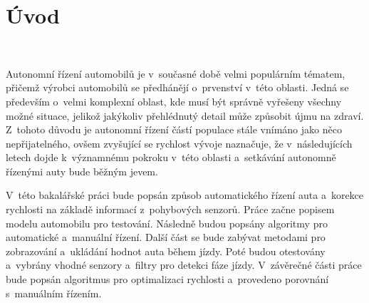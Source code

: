 \chapter*{Úvod}
\label{sec:Introduction}
\

Autonomní řízení automobilů je v~současné době velmi populárním tématem, přičemž
výrobci automobilů se předhánějí o~prvenství v~této oblasti. Jedná se především
o~velmi komplexní oblast, kde musí být správně vyřešeny všechny možné situace, jelikož
jakýkoliv přehlédnutý detail může způsobit újmu na zdraví. Z~tohoto důvodu je
autonomní řízení částí populace stále vnímáno jako něco  nepřijatelného, ovšem
zvyšující se rychlost vývoje naznačuje, že v~následujících letech dojde k~významnému
pokroku v~této oblasti a~setkávání autonomně řízenými auty bude běžným jevem.

V~této bakalářské práci bude popsán způsob automatického řízení auta a~korekce 
rychlosti na základě informací z~pohybových senzorů. Práce začne popisem modelu 
automobilu pro testování. Následně budou popsány algoritmy pro automatické a~manuální 
řízení. Další část se bude zabývat metodami pro zobrazování a~ukládání hodnot auta 
během jízdy. Poté budou otestovány a~vybrány vhodné senzory a~filtry pro detekci fáze 
jízdy. V~závěrečné části práce bude popsán algoritmus pro optimalizaci rychlosti 
a~provedeno porovnání s~manuálním řízením.

\endinput